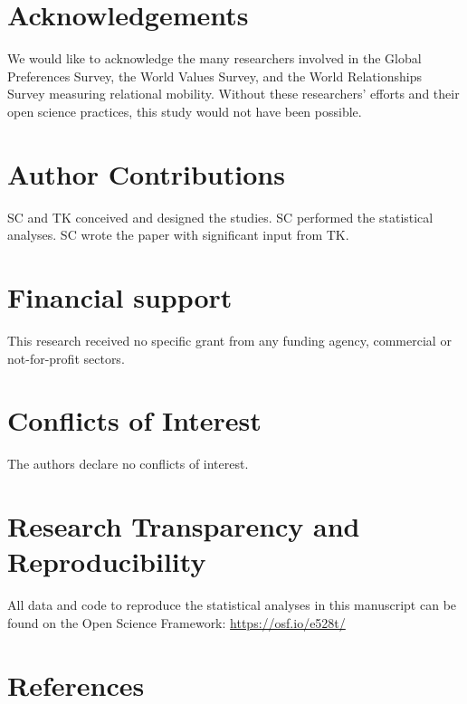\documentclass[
  man,floatsintext]{apa6}
\begin{document}
\newpage

\hypertarget{acknowledgements}{%
\section{Acknowledgements}\label{acknowledgements}}

We would like to acknowledge the many researchers involved in the Global Preferences Survey, the World Values Survey, and the World Relationships Survey measuring relational mobility. Without these researchers' efforts and their open science practices, this study would not have been possible.

\hypertarget{author-contributions}{%
\section{Author Contributions}\label{author-contributions}}

SC and TK conceived and designed the studies. SC performed the statistical analyses. SC wrote the paper with significant input from TK.

\hypertarget{financial-support}{%
\section{Financial support}\label{financial-support}}

This research received no specific grant from any funding agency, commercial or not-for-profit sectors.

\hypertarget{conflicts-of-interest}{%
\section{Conflicts of Interest}\label{conflicts-of-interest}}

The authors declare no conflicts of interest.

\hypertarget{research-transparency-and-reproducibility}{%
\section{Research Transparency and Reproducibility}\label{research-transparency-and-reproducibility}}

All data and code to reproduce the statistical analyses in this manuscript can be found on the Open Science Framework: \url{https://osf.io/e528t/}

\newpage

\hypertarget{references}{%
\section{References}\label{references}}
\end{document}
